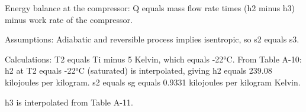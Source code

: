 Energy balance at the compressor:  
Q equals mass flow rate times (h2 minus h3) minus work rate of the compressor.  

Assumptions:  
Adiabatic and reversible process implies isentropic, so s2 equals s3.  

Calculations:  
T2 equals Ti minus 5 Kelvin, which equals -22°C.  
From Table A-10:  
h2 at T2 equals -22°C (saturated) is interpolated, giving h2 equals 239.08 kilojoules per kilogram.  
s2 equals sg equals 0.9331 kilojoules per kilogram Kelvin.  

h3 is interpolated from Table A-11.